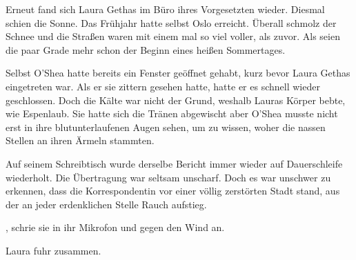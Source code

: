 Erneut fand sich Laura Gethas im Büro ihres Vorgesetzten wieder. Diesmal schien die Sonne. Das Frühjahr hatte selbst Oslo erreicht. Überall schmolz der Schnee und die Straßen waren mit einem mal so viel voller, als zuvor. Als seien die paar Grade mehr schon der Beginn eines heißen Sommertages.

\par

Selbst O'Shea hatte bereits ein Fenster geöffnet gehabt, kurz bevor Laura Gethas eingetreten war. Als er sie zittern gesehen hatte, hatte er es schnell wieder geschlossen. Doch die Kälte war nicht der Grund, weshalb Lauras Körper bebte, wie Espenlaub. Sie hatte sich die Tränen abgewischt aber O'Shea musste nicht erst in ihre blutunterlaufenen Augen sehen, um zu wissen, woher die nassen Stellen an ihren Ärmeln stammten.

\par

Auf seinem Schreibtisch wurde derselbe Bericht immer wieder auf Dauerschleife wiederholt. Die Übertragung war seltsam unscharf. Doch es war unschwer zu erkennen, dass die Korrespondentin vor einer völlig zerstörten Stadt stand, aus der an jeder erdenklichen Stelle Rauch aufstieg.

\par

, schrie sie in ihr Mikrofon und gegen den Wind an. 

\par

Laura fuhr zusammen. 

\par

